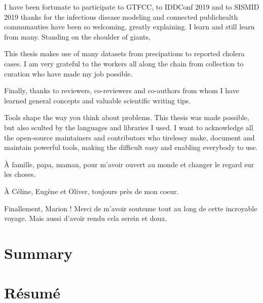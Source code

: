  I have been fortunate to participate to GTFCC, to IDDConf 2019 and to SISMID 2019 thanks for the infectious disease modeling and connected publichealth communauties have been so welcoming, greatly explaining. I learn and still learn from many. Standing on the shoulder of giants, 
 
 This thesis makes use of many datasets from precipations to reported cholera cases. I am very grateful to the workers all along the chain from collection to curation who have made my job possible.
 
 Finally, thanks to reviewers, co-reviewers and co-authors from whom I have learned general concepts and valuable scientific writing tips.
 
Tools shape the way you think about problems. This thesis was made possible, but also sculted by the languages and libraries I used. I want to acknowledge all the open-source maintainers and contributors who tirelessy make, document and maintain powerful tools, making the difficult easy and enabling everybody to use.

À famille, papa, maman, pour m'avoir ouvert au monde et changer le regard sur les choses.

À Céline, Eugène et Oliver, toujours près de mon coeur. %

Finallement, Marion ! Merci de m'avoir soutenue tout au long de cette incroyable voyage. Mais aussi d'avoir rendu cela serein et doux. 
 
 \chapter{Summary}
 
 \chapter{Résumé}